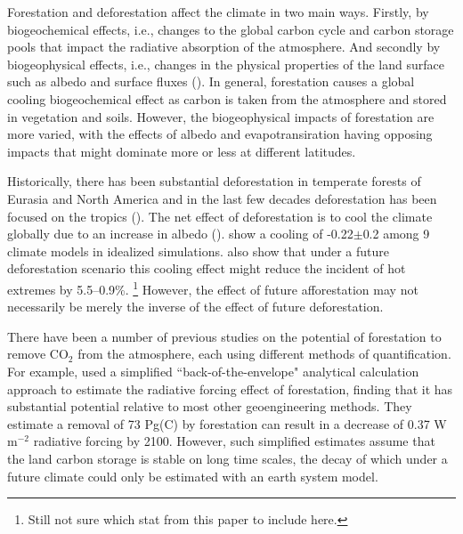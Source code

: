 \documentclass[]{article}
\begin{document}
Forestation and deforestation affect the climate in two main ways.
Firstly, by biogeochemical effects, i.e., changes to the global carbon cycle and carbon storage pools that impact the radiative absorption of the atmosphere.
And secondly by biogeophysical effects, i.e., changes in the physical properties of the land surface such as albedo and surface fluxes (\cite{bala_combined_2007}).
In general, forestation causes a global cooling biogeochemical effect as carbon is taken from the atmosphere and stored in vegetation and soils.
However, the biogeophysical impacts of forestation are more varied, %
with the effects of albedo and evapotransiration having opposing impacts that might dominate more or less at different latitudes.

Historically, there has been substantial deforestation in temperate forests of Eurasia and North America and in the last few decades deforestation has been focused on the tropics (\cite{goldewijk_estimating_2001}).
The net effect of deforestation is to cool the climate globally due to an increase in albedo  (\cite{davin_climatic_2010}).
\cite{boysen_global_2020} show a cooling of -0.22$\pm$0.2 \textcelsius{} among 9 climate models in idealized simulations.
\cite{hong_impacts_2022} also show that under a future deforestation scenario this cooling effect might reduce the incident of hot extremes by 5.5--0.9\%. \footnote{Still not sure which stat from this paper to include here.}
However, the effect of future afforestation may not necessarily be merely the inverse of the effect of future deforestation.

There have been a number of previous studies on the potential of forestation to remove CO$_2$ from the atmosphere, each using different methods of quantification.
For example, \cite{lenton_radiative_2009} used a simplified ``back-of-the-envelope" analytical calculation approach to estimate the radiative forcing effect of forestation, finding that it has substantial potential relative to most other geoengineering methods.
They estimate a removal of 73 Pg(C) by forestation can result in a decrease of 0.37 W m$^{-2}$ radiative forcing by 2100.
However, such simplified estimates assume that the land carbon storage is stable on long time scales, the decay of which under a future climate could only be estimated with an earth system model.
\end{document}
